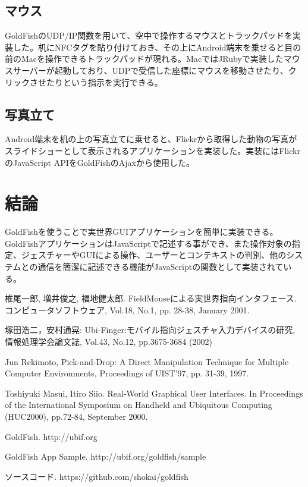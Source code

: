 \subsection{マウス}
GoldFishのUDP/IP関数を用いて、空中で操作するマウスとトラックパッドを実装した。机にNFCタグを貼り付けておき、その上にAndroid端末を乗せると目の前のMacを操作できるトラックパッドが現れる。MacではJRubyで実装したマウスサーバーが起動しており、UDPで受信した座標にマウスを移動させたり、クリックさせたりという指示を実行できる。


\subsection{写真立て}
Android端末を机の上の写真立てに乗せると、Flickrから取得した動物の写真がスライドショーとして表示されるアプリケーションを実装した。実装にはFlickrのJavaScript APIをGoldFishのAjaxから使用した。


\section{結論}
GoldFishを使うことで実世界GUIアプリケーションを簡単に実装できる。GoldFishアプリケーションはJavaScriptで記述する事ができ、また操作対象の指定、ジェスチャーやGUIによる操作、ユーザーとコンテキストの判別、他のシステムとの通信を簡潔に記述できる機能がJavaScriptの関数として実装されている。


\begin{thebibliography}{10}

椎尾一郎, 増井俊之, 福地健太郎. FieldMouseによる実世界指向インタフェース. コンピュータソフトウェア, Vol.18, No.1, pp. 28-38, January 2001.

塚田浩二，安村通晃: Ubi-Finger:モバイル指向ジェスチャ入力デバイスの研究, 情報処理学会論文誌, Vol.43, No.12, pp.3675-3684 (2002)

Jun Rekimoto, Pick-and-Drop: A Direct Manipulation Technique for Multiple Computer Environments, Proceedings of UIST'97, pp. 31-39, 1997.

Toshiyuki Masui, Itiro Siio. Real-World Graphical User Interfaces. In Proceedings of the International Symposium on Handheld and Ubiquitous Computing (HUC2000), pp.72-84, September 2000. 

GoldFish. http://ubif.org

GoldFish App Sample. http://ubif.org/goldfish/sample

ソースコード. https://github.com/shokai/goldfish

\end{thebibliography}

